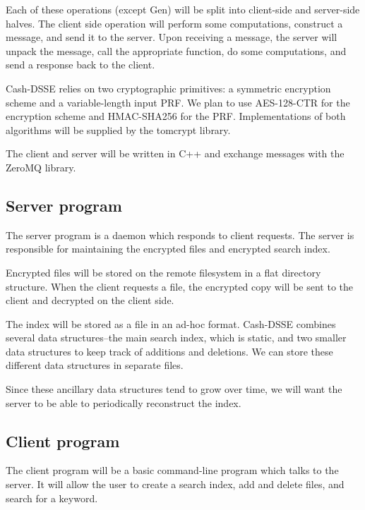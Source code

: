 Each of these operations (except Gen) will be split into client-side and server-side halves.
The client side operation will perform some computations, construct a message, and send it to the server.
Upon receiving a message, the server will unpack the message, 
call the appropriate function, do some computations,
and send a response back to the client.

Cash-DSSE relies on two cryptographic primitives:
a symmetric encryption scheme and a variable-length input PRF.
We plan to use AES-128-CTR for the encryption scheme and HMAC-SHA256 for the PRF.
Implementations of both algorithms will be supplied by the tomcrypt \cite{tomcrypt} library.

The client and server will be written in C++ and exchange messages with the ZeroMQ library.

\subsection{ Server program }

The server program is a daemon which responds to client requests.
The server is responsible for maintaining the encrypted files and encrypted search index.

Encrypted files will be stored on the remote filesystem in a flat directory structure.
When the client requests a file, the encrypted copy will be sent to the client and decrypted on the client side.

The index will be stored as a file in an ad-hoc format.
Cash-DSSE combines several data structures--the main search index, which is static, and two smaller data structures to keep track of additions and deletions.
We can store these different data structures in separate files. %

Since these ancillary data structures tend to grow over time, we will want the server to be able to periodically reconstruct the index. %

\subsection{ Client program }

The client program will be a basic command-line program which talks to the server.
It will allow the user to create a search index, add and delete files, and search for a keyword.

